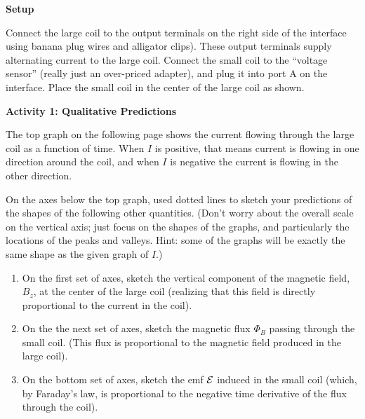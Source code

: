 \medskip
\textbf{Setup}

Connect the large coil to the output
terminals on the right side of the interface using banana plug wires and 
alligator clips). These output terminals supply alternating current to the 
large coil. Connect the small coil to the ``voltage 
sensor'' (really just an over-priced adapter), and plug it into port A on the interface. Place the small coil in 
the center of the large coil as shown.
\bigskip

\textbf{Activity 1: Qualitative Predictions} 

The top graph on the 
following page shows the current flowing through the large 
coil as a function of time. When $I$ is positive, that means current is 
flowing in one direction around the coil, and when $I$ is negative the current 
is flowing in the other direction. 

On the axes below the top graph, used dotted lines to sketch your predictions of the 
shapes of the following other quantities.
(Don't worry about the overall scale on the vertical axis;
just focus on the shapes of the graphs, and particularly the locations
of the peaks and valleys.  Hint: some of the graphs will be exactly
the same shape as the given graph of $I$.)

\begin{enumerate}
\item
On the first set of axes, sketch the vertical component of the magnetic field,
$B_z$, at the center of the large coil (realizing that this field is directly
proportional to the current in the coil).
\item On the the next set of axes, sketch the magnetic flux $\Phi_ B$ passing
through the small coil. (This flux is proportional to the magnetic field 
produced in the large coil).
\item On the bottom set of axes, sketch the emf ${\cal E}$ induced in the small
coil (which, by Faraday's law, is proportional to the negative time derivative 
of the flux through the coil).
\end{enumerate}

